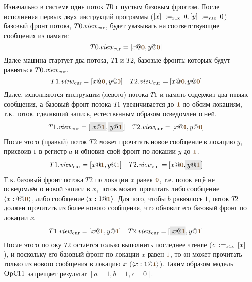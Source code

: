Изначально в системе один поток $T0$ с пустым базовым фронтом.
После исполнения первых двух инструкций программы
($[x] \;:=_{\mathtt{rlx}}\;0; [y] \;:=_{\mathtt{rlx}}\;0$) базовый фронт потока, $T0.\mathit{view}_{\mathrm{cur}}$, будет указывать на
соответствующие сообщения из памяти:
\[
T0.\Rcur = [x@\tstamp{0}, y@\tstamp{0}]
\]
Далее машина стартует два потока, $T1$ и $T2$, базовые фронты которых будут равняться $T0.\mathit{view}_{\mathrm{cur}}$.
\[
T1.\Rcur = [x@\tstamp{0}, y@\tstamp{0}] \quad T2.\Rcur = [x@\tstamp{0}, y@\tstamp{0}]
\]
Далее, исполняются инструкции (левого) потока $T1$ и память содержит два новых сообщения,
а базовый фронт потока $T1$ увеличивается до $\tstamp{1}$ по обоим локациям,
т.к. поток, сделавший запись, естественным образом осведомлен о ней.
\[
\begin{array}{l}
T1.\Rcur = [\graybox{x@\tstamp{1}}, \graybox{y@\tstamp{1}}] \quad T2.\Rcur = [x@\tstamp{0}, y@\tstamp{0}]
\end{array}
\]
После этого (правый) поток $T2$ может прочитать новое сообщение в локацию $y$, присвоив $1$ в регистр $a$
и обновив свой фронт по локации $y$ до $\tstamp{1}$.
\[
\begin{array}{l}
T1.\Rcur = [x@\tstamp{1}, y@\tstamp{1}] \quad T2.\Rcur = [x@\tstamp{0}, \graybox{y@\tstamp{1}}]
\end{array}
\]
Т.к. базовый фронт потока $T2$ по локации $x$ равен $\tstamp{0}$, т.е. поток ещё не осведомлён о новой записи в $x$,
поток может прочитать либо сообщение $\angled{x:0@\tstamp{0}}$, либо сообщение $\angled{x:1@\tstamp{1}}$.
Для того, чтобы $b$ равнялось $1$, поток $T2$ должен прочитать из более нового сообщения, что обновит его
базовый фронт по локации $x$.
\[
\begin{array}{l}
T1.\Rcur = [x@\tstamp{1}, y@\tstamp{1}] \quad T2.\Rcur = [\graybox{x@\tstamp{1}}, y@\tstamp{1}]
\end{array}
\]
После этого потоку $T2$ остаётся только выполнить последнее чтение ($c \;:=_{\mathtt{rlx}}\;[x]$),
и поскольку его базовый фронт по локации $x$ равен $\tstamp{1}$, то он может прочитать только
из нового сообщения в локацию $x$ ($\angled{x:1@\tstamp{1}}$).
Таким образом модель $\mathrm{OpC11}$ запрещает результат $[a = 1, b = 1, c = 0]$.


